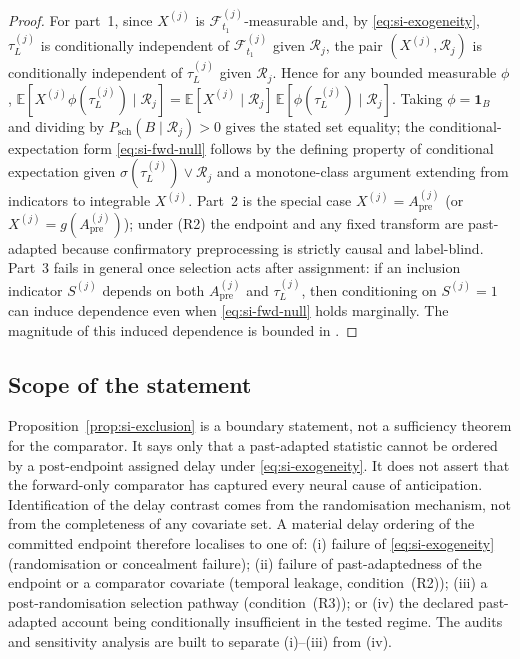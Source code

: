 \documentclass[11pt,a4paper]{article}
\theoremstyle{definition}
\newcommand{\F}{\mathcal{F}}
\newcommand{\Apre}{A_{\mathrm{pre}}}
\newcommand{\tauL}{\tau_L}
\begin{document}
\begin{proof}
For part~1, since \(X^{(j)}\) is \(\F_{t_1}^{(j)}\)-measurable and, by
\eqref{eq:si-exogeneity}, \(\tauL^{(j)}\) is conditionally independent of
\(\F_{t_1}^{(j)}\) given \(\mathcal{R}_j\), the pair
\((X^{(j)},\mathcal{R}_j)\) is conditionally independent of \(\tauL^{(j)}\) given
\(\mathcal{R}_j\). Hence for any bounded measurable \(\phi\),
\(\mathbb{E}[X^{(j)}\phi(\tauL^{(j)})\mid\mathcal{R}_j]
=\mathbb{E}[X^{(j)}\mid\mathcal{R}_j]\,\mathbb{E}[\phi(\tauL^{(j)})\mid\mathcal{R}_j]\).
Taking \(\phi=\mathbf{1}_B\) and dividing by
\(P_{\mathrm{sch}}(B\mid\mathcal{R}_j)>0\) gives the stated set equality; the
conditional-expectation form \eqref{eq:si-fwd-null} follows by the defining
property of conditional expectation given \(\sigma(\tauL^{(j)})\vee\mathcal{R}_j\)
and a monotone-class argument extending from indicators to integrable \(X^{(j)}\).
Part~2 is the special case \(X^{(j)}=\Apre^{(j)}\) (or
\(X^{(j)}=g(\Apre^{(j)})\)); under (R2) the endpoint and any fixed transform are
past-adapted because confirmatory preprocessing is strictly causal and
label-blind. Part~3 fails in general once selection acts after assignment: if an
inclusion indicator \(S^{(j)}\) depends on both \(\Apre^{(j)}\) and
\(\tauL^{(j)}\), then conditioning on \(S^{(j)}=1\) can induce dependence even
when \eqref{eq:si-fwd-null} holds marginally. The magnitude of this induced
dependence is bounded in .
\end{proof}

\subsection{Scope of the statement}
\label{sec:si-scope}

Proposition~\ref{prop:si-exclusion} is a boundary statement, not a sufficiency
theorem for the comparator. It says only that a past-adapted statistic cannot be
ordered by a post-endpoint assigned delay under \eqref{eq:si-exogeneity}. It does
not assert that the forward-only comparator has captured every neural cause of
anticipation. Identification of the delay contrast comes from the randomisation
mechanism, not from the completeness of any covariate set. A material
delay ordering of the committed endpoint therefore localises to one of:
(i) failure of \eqref{eq:si-exogeneity} (randomisation or concealment failure);
(ii) failure of past-adaptedness of the endpoint or a comparator covariate
(temporal leakage, condition~(R2)); (iii) a post-randomisation selection pathway
(condition~(R3)); or (iv) the declared past-adapted account being conditionally
insufficient in the tested regime. The audits and sensitivity analysis are built
to separate (i)--(iii) from (iv).
\end{document}
